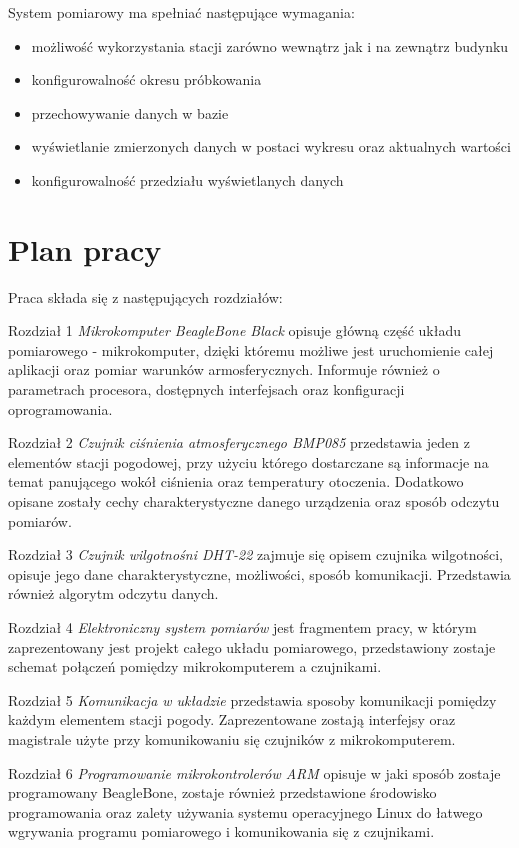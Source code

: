 System pomiarowy ma spełniać następujące wymagania:
\begin{itemize}
\setlength{\itemsep}{2pt} 
\setlength{\parskip}{2pt} 
\setlength{\parsep}{2pt}
\item możliwość wykorzystania stacji zarówno wewnątrz jak i na zewnątrz budynku
\item konfigurowalność okresu próbkowania
\item przechowywanie danych w bazie
\item wyświetlanie zmierzonych danych w postaci wykresu oraz aktualnych wartości
\item konfigurowalność przedziału wyświetlanych danych
\end{itemize}
\section*{Plan pracy}
Praca składa się z następujących rozdziałów:

Rozdział 1 \textit{Mikrokomputer BeagleBone Black} opisuje główną część układu pomiarowego - mikrokomputer, dzięki któremu możliwe jest uruchomienie całej aplikacji oraz pomiar warunków armosferycznych. Informuje również o parametrach procesora, dostępnych interfejsach oraz konfiguracji oprogramowania.


Rozdział 2 \textit{Czujnik ciśnienia atmosferycznego BMP085} przedstawia jeden z elementów stacji pogodowej, przy użyciu którego dostarczane są informacje na temat panującego wokół ciśnienia oraz temperatury otoczenia. Dodatkowo opisane zostały cechy charakterystyczne danego urządzenia oraz sposób odczytu pomiarów.


Rozdział 3 \textit{Czujnik wilgotnośni DHT-22} zajmuje się opisem czujnika wilgotności, opisuje jego dane charakterystyczne, możliwości, sposób komunikacji. Przedstawia również algorytm odczytu danych.


Rozdział 4 \textit{Elektroniczny system pomiarów} jest fragmentem pracy, w którym zaprezentowany jest projekt całego układu pomiarowego, przedstawiony zostaje schemat połączeń pomiędzy mikrokomputerem a czujnikami.


Rozdział 5 \textit{Komunikacja w układzie} przedstawia sposoby komunikacji pomiędzy każdym elementem stacji pogody. Zaprezentowane zostają interfejsy oraz magistrale użyte przy komunikowaniu się czujników z mikrokomputerem.


Rozdział 6 \textit{Programowanie mikrokontrolerów ARM} opisuje w jaki sposób zostaje programowany BeagleBone, zostaje również przedstawione środowisko programowania oraz zalety używania systemu operacyjnego Linux do łatwego wgrywania programu pomiarowego i komunikowania się z czujnikami.


